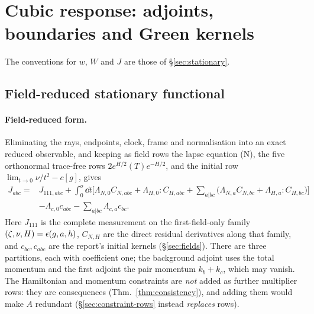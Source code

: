 \section{Cubic response: adjoints, boundaries and Green kernels}\label{app:cubic-technical}
The conventions for $w$, $W$ and $J$ are those of \S\ref{sec:stationary}.

\subsection{Field-reduced stationary functional}
\paragraph{Field-reduced form.} Eliminating the rays, endpoints, clock, frame and normalisation
into an exact reduced observable, and keeping as field rows the lapse equation (N), the five
orthonormal trace-free rows $2e^{H/2}(T)e^{-H/2}$, and the initial row
$\lim_{t\to0}\nu/t^2-c[g]$, gives
\begin{equation}\label{eq:stationary-field}
\begin{split}
 J_{abc}={}&J_{111,abc}
 +\int_0^o\dd t\Big[\Lambda_{N,0}C_{N,abc}+\Lambda_{H,0}:C_{H,abc}
 +\sum_{a|bc}\big(\Lambda_{N,a}C_{N,bc}+\Lambda_{H,a}:C_{H,bc}\big)\Big]\\
 &-\Lambda_{c,0}c_{abc}-\sum_{a|bc}\Lambda_{c,a}c_{bc}.
\end{split}
\end{equation}
Here $J_{111}$ is the complete measurement on the first-field-only family
$(\zeta,\nu,H)=\epsilon(g,a,h)$, $C_{N,H}$ are the direct residual derivatives along that family, and
$c_{bc},c_{abc}$ are the report's initial kernels (\S\ref{sec:fields}). There are three
partitions, each with coefficient one; the background adjoint uses the total momentum and the
first adjoint the pair momentum $k_b+k_c$, which may vanish. The Hamiltonian and momentum
constraints are \emph{not} added as further multiplier rows: they are consequences
(Thm.~\ref{thm:consistency}), and adding them would make $A$ redundant
(\S\ref{sec:constraint-rows} instead \emph{replaces} rows).

